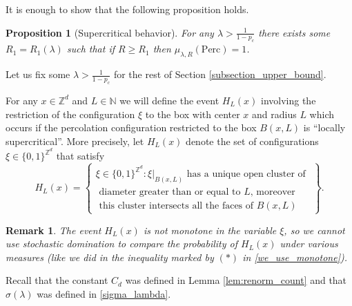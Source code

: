 \documentclass[a4paper,12pt]{article}
\newtheorem  {proposition}   [theorem]{Proposition}
\newtheorem  {remark}        [theorem]{Remark}
\newcommand{\Z}{\mathbb{Z}}
\begin{document}
 It is enough to  show that the following proposition holds.
  \begin{proposition}[Supercritical behavior]\label{prop_supercrit}
  For any $\lambda > \frac{1}{1-p_c}$ there exists some $R_1=R_1(\lambda)$ such that if $R \geq R_1$ then $\mu_{\lambda,R}(\mathrm{Perc})=1$.
  \end{proposition}

Let us fix some $\lambda > \frac{1}{1-p_c}$  for the rest of Section \ref{subsection_upper_bound}.

For any $x \in \mathbb{Z}^d$ and $L \in \mathbb{N}$
we will define the  event $H_L(x)$ involving the restriction of the configuration $\xi$ to the box with center $x$ and radius $L$ which occurs if the percolation configuration restricted to the box $B(x,L)$ is ``locally supercritical''. More precisely, let $H_L(x)$ denote the set of configurations $\xi \in \{0,1\}^{\Z^d}$ that satisfy
\begin{equation}\label{high_connect}
H_L(x) = \left\{\begin{array}{c} \xi \in \{0,1\}^{\Z^d}:  \xi|_{B(x,L)}\text{ has a unique open cluster of }\\
\text{  diameter greater than or equal to $L$, moreover } \\
\text{ this cluster intersects all the faces of $B(x,L)$}\end{array} \right\}.
\end{equation}



\begin{remark}\label{remark_not_monotone} The event $H_L(x)$ is not monotone in the variable $\xi$, so we cannot use stochastic domination to compare the probability of
$H_L(x)$ under various measures (like we did in the inequality marked by $(*)$ in \eqref{we_use_monotone}).
\end{remark}

Recall that the constant $C_d$ was defined in Lemma \ref{lem:renorm_count} and that $\sigma(\lambda)$ was defined in \eqref{sigma_lambda}.
\end{document}
